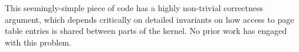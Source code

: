 This seemingly-simple piece of code has a highly non-trivial correctness argument, which depends critically on detailed invariants on how access to page table
entries is shared between parts of the kernel. No prior work has engaged with this problem.

